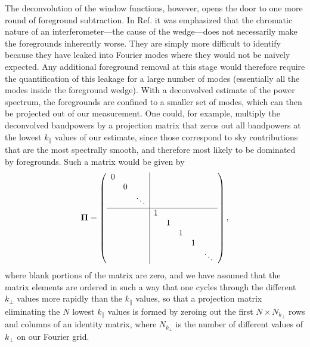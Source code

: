 \documentclass[twocolumn,aps,prd,nofootinbib,showpacs]{revtex4-1}
\begin{document}
The deconvolution of the window functions, however, opens the door to one more round of foreground subtraction.  In Ref. \cite{Shaw2014b} it was emphasized that the chromatic nature of an interferometer---the cause of the wedge---does not necessarily make the foregrounds inherently worse.  They are simply more difficult to identify because they have leaked into Fourier modes where they would not be naively expected.  Any additional foreground removal at this stage would therefore require the quantification of this leakage for a large number of modes (essentially all the modes inside the foreground wedge).  With a deconvolved estimate of the power spectrum, the foregrounds are confined to a smaller set of modes, which can then be projected out of our measurement.  One could, for example, multiply the deconvolved bandpowers by a projection matrix that zeros out all bandpowers at the lowest $k_\parallel$ values of our estimate, since those correspond to sky contributions that are the most spectrally smooth, and therefore most likely to be dominated by foregrounds.  Such a matrix would be given by
\begin{equation}
\boldsymbol \Pi = \left( \begin{array}{ccc|ccccc}
0&   & && & &&\\
& 0 && & &&&\\
    &  & \ddots & & &&&\\
  \hline
&  & &1&  &  & &  \\
&  & &  &1 & & &  \\
&  & &  &  &1 & &  \\
&  & & & &&1&\\
    &  & & & &&&\ddots\\
\end{array}
\right),
\end{equation}
where blank portions of the matrix are zero, and we have assumed that the matrix elements are ordered in such a way that one cycles through the different $k_\perp$ values more rapidly than the $k_\parallel$ values, so that a projection matrix eliminating the $N$ lowest $k_\parallel$ values is formed by zeroing out the first $N \times N_{k_\perp}$ rows and columns of an identity matrix, where $N_{k_\perp}$ is the number of different values of $k_\perp$ on our Fourier grid.
\end{document}
